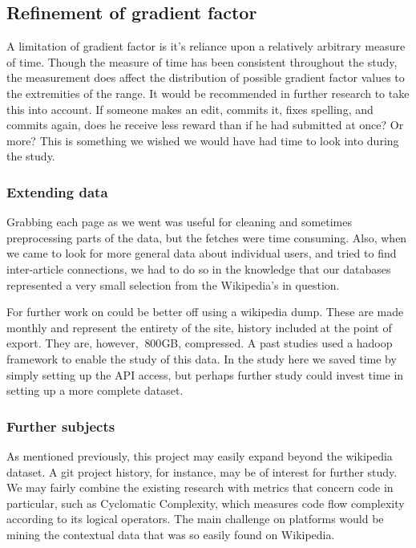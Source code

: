 \subsection*{Refinement of gradient factor}
A limitation of gradient factor is it's reliance upon a relatively
arbitrary measure of time. Though the measure of time has been
consistent throughout the study, the measurement does affect the
distribution of possible gradient factor values to the extremities of
the range. It would be recommended in further research to take this
into account. If someone makes an edit, commits it, fixes spelling,
and commits again, does he receive less reward than if he had
submitted at once? Or more? This is something we wished we would have
had time to look into during the study.

\subsubsection*{Extending data}
Grabbing each page as we went was useful for cleaning and sometimes
preprocessing parts of the data, but the fetches were time
consuming. Also, when we came to look for more general data about
individual users, and tried to find inter-article connections, we had
to do so in the knowledge that our databases represented a very small
selection from the Wikipedia's in question.

For further work on could be better off using a wikipedia dump. These
are made monthly and represent the entirety of the site, history
included at the point of export. They are, however, $~800$GB,
compressed.\cite{wiki-dump} A past studies used a hadoop framework
to enable the study of this data. In the study here we saved time by
simply setting up the API access, but perhaps further study could
invest time in setting up a more complete dataset.

\subsubsection*{Further subjects}
As mentioned previously, this project may easily expand beyond the
wikipedia dataset. A git project history, for instance, may be of
interest for further study. We may fairly combine the existing
research with metrics that concern code in particular, such as
Cyclomatic Complexity, which measures code flow complexity according
to its logical operators.\cite{McCabe1976} The main challenge on
platforms would be mining the contextual data that was so easily found
on Wikipedia.
